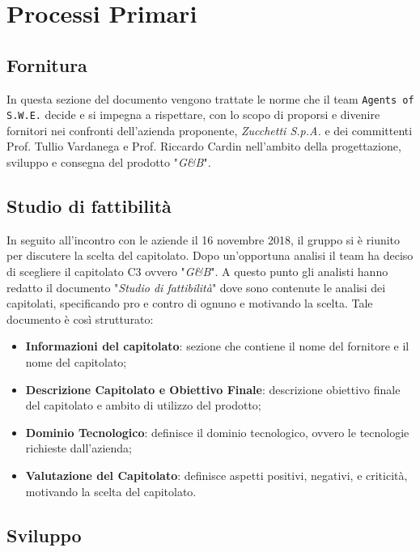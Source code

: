 \section{Processi Primari}\label{ProcessiPrimari}

\subsection{Fornitura}
In questa sezione del documento vengono trattate le norme che il team \texttt{Agents of S.W.E.} decide e si impegna a rispettare, con lo scopo di proporsi e divenire fornitori nei confronti dell'azienda proponente, \textit{Zucchetti S.p.A.} e dei committenti Prof. Tullio Vardanega e Prof. Riccardo Cardin nell'ambito della progettazione, sviluppo e consegna del prodotto "\textit{G\&B}".

\subsection{Studio di fattibilità} \label{ProcessiPrimari_Sviluppo_StudioFattibilità}
In seguito all'incontro con le aziende il 16 novembre 2018, il gruppo si è riunito per discutere la scelta del capitolato. Dopo un'opportuna analisi il team ha deciso di scegliere il capitolato C3 ovvero "\textit{G\&B}". A questo punto gli analisti hanno redatto il documento "\textit{Studio di fattibilità}" dove sono contenute le analisi dei capitolati, specificando pro e contro di ognuno e motivando la scelta.
Tale documento è così strutturato: 
\begin{itemize}
	\item \textbf{Informazioni del capitolato}: sezione che contiene il nome del fornitore e il nome del capitolato;
	\item \textbf{Descrizione Capitolato e Obiettivo Finale}: descrizione obiettivo finale del capitolato e ambito di utilizzo del prodotto;
	\item \textbf{Dominio Tecnologico}: definisce il dominio tecnologico, ovvero le tecnologie richieste dall'azienda;
	\item \textbf{Valutazione del Capitolato}: definisce aspetti positivi, negativi, e criticità, motivando la scelta del capitolato.  
\end{itemize} 


\subsection{Sviluppo}
